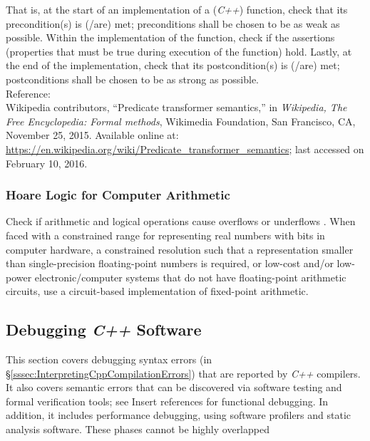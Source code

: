 	That is, at the start of an implementation of a ({\it C++}) function, check that its precondition(s) is (/are) met; preconditions shall be chosen to be as weak as possible. Within the implementation of the function, check if the assertions (properties that must be true during execution of the function) hold. Lastly, at the end of the implementation, check that its postcondition(s) is (/are) met; postconditions shall be chosen to be as strong as possible. \\

Reference: \\
Wikipedia contributors, ``Predicate transformer semantics,'' in {\it Wikipedia, The Free Encyclopedia: Formal methods}, Wikimedia Foundation, San Francisco, CA, November 25, 2015. Available online at: \url{https://en.wikipedia.org/wiki/Predicate_transformer_semantics}; last accessed on February 10, 2016.



\subsubsection{Hoare Logic for Computer Arithmetic}
\label{sssec:HoareLogicForComputerArithmetic}

	Check if arithmetic and logical operations cause overflows or underflows \cite{Crowl2015,Crowl2012}. When faced with a constrained range for representing real numbers with bits in computer hardware, a constrained resolution such that a representation smaller than single-precision floating-point numbers is required, or low-cost and/or low-power electronic/computer systems that do not have floating-point arithmetic circuits, use a circuit-based implementation of fixed-point arithmetic.



\subsection{Debugging {\it C++} Software}
\label{ssec:DebuggingCppSoftware}

	This section covers debugging syntax errors (in \S\ref{sssec:InterpretingCppCompilationErrors}) that are reported by {\it C++} compilers. It also covers semantic errors that can be discovered via software testing and formal verification tools; see {\Huge Insert references for functional debugging}. In addition, it includes performance debugging, using software profilers and static analysis software. These phases cannot be highly overlapped
\ \\

